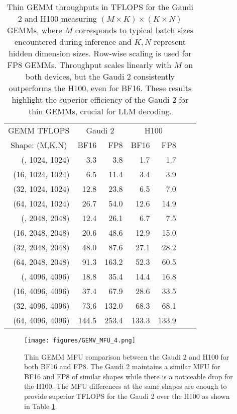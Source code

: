 \begin{table}[]
\small
\centering
\caption{Thin GEMM throughputs in TFLOPS for the Gaudi 2 and H100 measuring $(M \times K)\times(K \times N)$ GEMMs, where $M$ corresponds to typical batch sizes encountered during inference and $K,N$ represent hidden dimension sizes. Row-wise scaling is used for FP8 GEMMs.
Throughput scales linearly with $M$ on both devices, but the Gaudi 2 consistently outperforms the H100, even for BF16. These results highlight the superior efficiency of the Gaudi 2 for thin GEMMs, crucial for LLM decoding.
}
\vskip 0.15in
\begin{tabular}{@{}rrrrrrr@{}}
\toprule
GEMM TFLOPS & \multicolumn{2}{c}{Gaudi 2} & \multicolumn{2}{c}{H100} \\ 
\multicolumn{1}{c}{Shape: (M,K,N)} & BF16 & FP8 & BF16 & FP8 \\ \midrule
(\enspace 8, 1024, 1024) &   3.3 &   3.8 &   1.7 &   1.7 \\
(16, 1024, 1024) &   6.5 &  11.4 &   3.4 &   3.9 \\
(32, 1024, 1024) &  12.8 &  23.8 &   6.5 &   7.0 \\
(64, 1024, 1024) &  26.7 &  54.0 &  12.6 &  14.9 \\ \midrule
(\enspace 8, 2048, 2048) &  12.4 &  26.1 &   6.7 &   7.5 \\
(16, 2048, 2048) &  20.6 &  48.6 &  12.9 &  15.0 \\
(32, 2048, 2048) &  48.0 &  87.6 &  27.1 &  28.2 \\
(64, 2048, 2048) &  91.3 & 163.2 &  52.3 &  60.5 \\ \midrule
(\enspace 8, 4096, 4096) &  18.8 &  35.4 &  14.4 &  16.8 \\
(16, 4096, 4096) &  37.4 &  67.9 &  28.6 &  33.5 \\
(32, 4096, 4096) &  73.6 & 132.0 &  68.3 &  68.1 \\
(64, 4096, 4096) & 144.5 & 253.4 & 133.3 & 133.9 \\ \bottomrule
\end{tabular}
\vskip -0.1in
\label{tab:thin_gemm}
\end{table}

\begin{figure}[]
    \centering
    \texttt{[image: figures/GEMV\_MFU\_4.png]}
    \vspace{-1.6em}
    \caption{Thin GEMM MFU comparison between the Gaudi 2 and H100 for both BF16 and FP8. The Gaudi 2 maintains a similar MFU for BF16 and FP8 of similar shapes while there is a noticeable drop for the H100. The MFU differences at the same shapes are enough to provide superior TFLOPS for the Gaudi 2 over the H100 as shown in Table \ref{tab:thin_gemm}.}
    \label{fig:Decode_efficiency}
    \vskip -0.1in
\end{figure}
